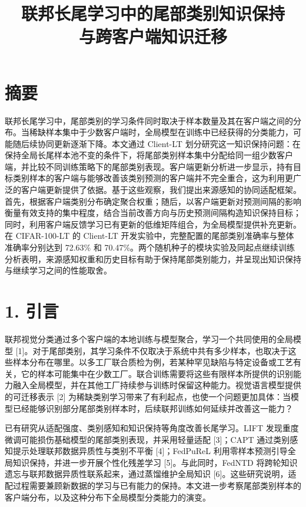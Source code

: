 \documentclass[UTF8,a4paper,10pt,fontset=fandol]{ctexart}
\title{联邦长尾学习中的尾部类别知识保持\\与跨客户端知识迁移}
\author{}
\date{}
\begin{document}
\maketitle
\vspace{-2em}


\section*{摘要}

联邦长尾学习中，尾部类别的学习条件同时取决于样本数量及其在客户端之间的分布。当稀缺样本集中于少数客户端时，全局模型在训练中已经获得的分类能力，可能随后续协同更新逐渐下降。本文通过 Client-LT 划分研究这一知识保持问题：在保持全局长尾样本池不变的条件下，将尾部类别样本集中分配给同一组少数客户端，并比较不同训练策略下的尾部类别表现。客户端更新分析进一步显示，持有目标类别样本的客户端与能够改善该类别预测的客户端并不完全重合，这为利用更广泛的客户端更新提供了依据。基于这些观察，我们提出来源感知的协同适配框架。首先，根据客户端类别分布确定聚合权重；随后，以客户端更新对预测间隔的影响衡量有效支持的集中程度，结合当前改善方向与历史预测间隔构造知识保持目标；同时，利用客户端反馈学习已有更新的低维矩阵组合，为全局模型提供补充更新。在 CIFAR-100-LT 的 Client-LT 开发实验中，完整配置的尾部类别准确率与整体准确率分别达到 72.63\% 和 70.47\%。两个随机种子的模块实验及同起点继续训练分析表明，来源感知权重和历史目标有助于保持尾部类别能力，并呈现出知识保持与继续学习之间的性能取舍。


\section*{1. 引言}

联邦视觉分类通过多个客户端的本地训练与模型聚合，学习一个共同使用的全局模型 [1]。对于尾部类别，其学习条件不仅取决于系统中共有多少样本，也取决于这些样本分布在哪里。以多工厂联合质检为例，若某种罕见缺陷与特定设备或工艺有关，它的样本可能集中在少数工厂。联合训练需要将这些有限样本所提供的识别能力融入全局模型，并在其他工厂持续参与训练时保留这种能力。视觉语言模型提供的可迁移表示 [2] 为稀缺类别学习带来了有利起点，也使一个问题更加具体：当模型已经能够识别部分尾部类别样本时，后续联邦训练如何延续并改善这一能力？


已有研究从适配强度、类别感知和知识保持等角度改善长尾学习。LIFT 发现重度微调可能损伤基础模型的尾部类别表现，并采用轻量适配 [3]；CAPT 通过类别感知提示处理联邦数据异质性与类别不平衡 [4]；FedPuReL 利用零样本预测引导全局知识保持，并进一步开展个性化残差学习 [5]。与此同时，FedNTD 将跨轮知识遗忘与联邦数据异质性联系起来，通过蒸馏维护全局知识 [6]。这些研究说明，适配过程需要兼顾新数据的学习与已有能力的保持。本文进一步考察尾部类别样本的客户端分布，以及这种分布下全局模型分类能力的演变。
\end{document}
